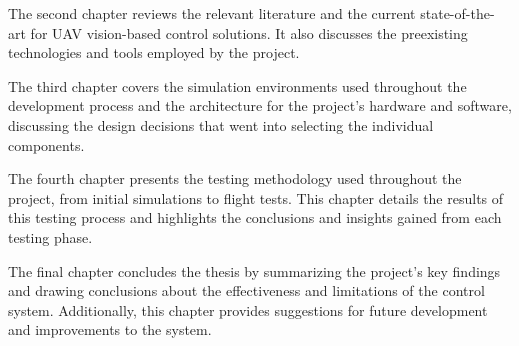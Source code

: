 The second chapter reviews the relevant literature and the current state-of-the-art for UAV vision-based control solutions. It also discusses the preexisting technologies and tools employed by the project.

The third chapter covers the simulation environments used throughout the development process and the architecture for the project's hardware and software, discussing the design decisions that went into selecting the individual components.

The fourth chapter presents the testing methodology used throughout the project, from initial simulations to flight tests. This chapter details the results of this testing process and highlights the conclusions and insights gained from each testing phase.

The final chapter concludes the thesis by summarizing the project's key findings and drawing conclusions about the effectiveness and limitations of the control system. Additionally, this chapter provides suggestions for future development and improvements to the system.
